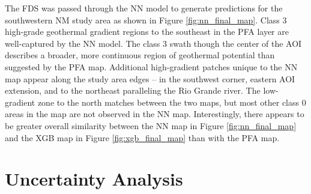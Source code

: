 The FDS was passed through the NN model to generate predictions for the southwestern NM study area as shown in Figure \ref{fig:nn_final_map}. Class 3 high-grade geothermal gradient regions to the southeast in the \citet{bielicki_hydrogeolgic_2015} PFA layer are well-captured by the NN model. The class 3 swath though the center of the AOI describes a broader, more continuous region of geothermal potential than suggested by the PFA map. Additional high-gradient patches unique to the NN map appear along the study area edges – in the southwest corner, eastern AOI extension, and to the northeast paralleling the Rio Grande river. The low-gradient zone to the north matches between the two maps, but most other class 0 areas in the \citeauthor{bielicki_hydrogeolgic_2015} map are not observed in the NN map. Interestingly, there appears to be greater overall similarity between the NN map in Figure \ref{fig:nn_final_map} and the XGB map in Figure \ref{fig:xgb_final_map} than with the PFA map.

\section{Uncertainty Analysis}




